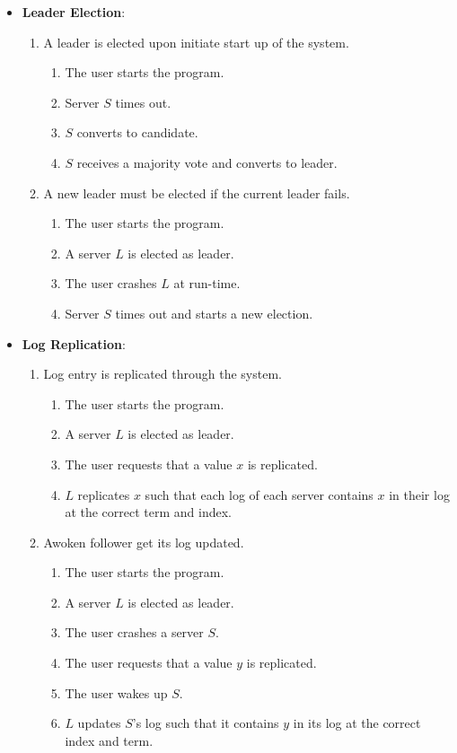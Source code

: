 \begin{itemize}
\item \textbf{Leader Election}:
    \begin{enumerate}
    \item A leader is elected upon initiate start up of the system.
        \begin{enumerate}
        \item The user starts the program.
        \item Server $S$ times out.
        \item $S$ converts to candidate.
        \item $S$ receives a majority vote and converts to leader.
        \end{enumerate}
    \item A new leader must be elected if the current leader fails.
        \begin{enumerate}
        \item The user starts the program.
        \item A server $L$ is elected as leader.
        \item The user crashes $L$ at run-time.
        \item Server $S$ times out and starts a new election.
        \end{enumerate}
    \end{enumerate}
\item \textbf{Log Replication}:
    \begin{enumerate}
    \item Log entry is replicated through the system.
        \begin{enumerate}
        \item The user starts the program.
        \item A server $L$ is elected as leader.
        \item The user requests that a value $x$ is replicated.
        \item $L$ replicates $x$ such that each log of each server contains $x$ in their log at the correct term and index.
        \end{enumerate}
    \item Awoken follower get its log updated.
        \begin{enumerate}
        \item The user starts the program.
        \item A server $L$ is elected as leader.
        \item The user crashes a server $S$.
        \item The user requests that a value $y$ is replicated.
        \item The user wakes up $S$.
        \item $L$ updates $S$'s log such that it contains $y$ in its log at the correct index and term.
        \end{enumerate}
    \end{enumerate}
\end{itemize}
